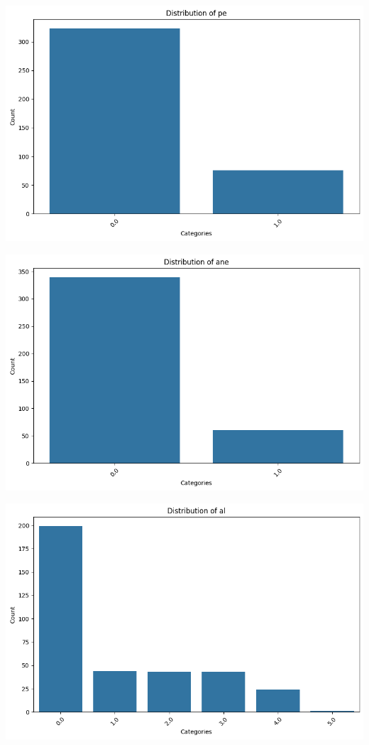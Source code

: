 \documentclass[
  11pt,
  letterpaper,
  DIV=11,
  numbers=noendperiod]{scrartcl}
\begin{document}
\includegraphics{Assignment6_Final version_files/figure-pdf/cell-15-output-9.png}

\includegraphics{Assignment6_Final version_files/figure-pdf/cell-15-output-10.png}

\includegraphics{Assignment6_Final version_files/figure-pdf/cell-15-output-11.png}
\end{document}
